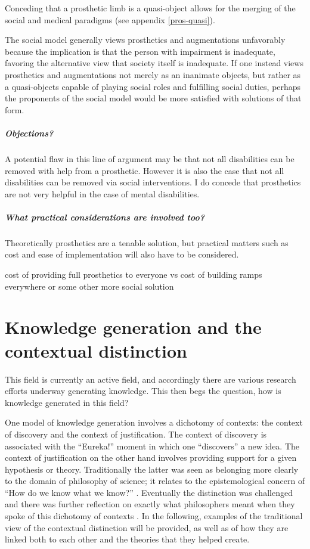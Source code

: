 \documentclass[a4paper]{article}
\begin{document}
Conceding that a prosthetic limb is a quasi-object allows for the merging of
the social and medical paradigms (see appendix \autoref{pros-quasi}).

The social model generally views prosthetics and augmentations unfavorably
because the implication is that the person with impairment is inadequate,
favoring the alternative view that society itself is inadequate. If one
instead views prosthetics and augmentations not merely as an inanimate
objects, but rather as a quasi-objects capable of playing social roles and
fulfilling social duties, perhaps the proponents of the social model would be
more satisfied with solutions of that form.

\subparagraph{Objections?}

A potential flaw in this line of argument may be that not all disabilities can
be removed with help from a prosthetic. However it is also the case that not
all disabilities can be removed via social interventions. I do concede that
prosthetics are not very helpful in the case of mental disabilities.

\subparagraph{What practical considerations are involved too?}

Theoretically prosthetics are a tenable solution, but practical matters such as
cost and ease of implementation will also have to be considered.

cost of providing full prosthetics to everyone vs cost of building ramps
everywhere or some other more social solution


\newpage
\section{Knowledge generation and the contextual distinction}

This field is currently an active field, and accordingly there are various
research efforts underway generating knowledge. This then begs the question,
how is knowledge generated in this field?


One model of knowledge generation involves a dichotomy of contexts: the
context of discovery and the context of justification. The context of
discovery is associated with the ``Eureka!'' moment in which one ``discovers''
a new idea. The context of justification on the other hand involves providing
support for a given hypothesis or theory. Traditionally the latter was seen as
belonging more clearly to the domain of philosophy of science; it relates to
the epistemological concern of ``How do we know what we know?''
\citep{schickore2014scientific}. Eventually the distinction was challenged and
there was further reflection on exactly what philosophers meant when they
spoke of this dichotomy of contexts \citep{hoyningen2006context}. In the
following, examples of the traditional view of the contextual distinction will
be provided, as well as of how they are linked both to each other and the
theories that they helped create.
\end{document}
